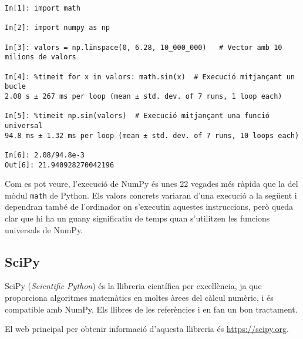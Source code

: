 \begin{lstlisting}
In[1]: import math

In[2]: import numpy as np

In[3]: valors = np.linspace(0, 6.28, 10_000_000)   # Vector amb 10 milions de valors

In[4]: %timeit for x in valors: math.sin(x)  # Execució mitjançant un bucle
2.08 s ± 267 ms per loop (mean ± std. dev. of 7 runs, 1 loop each)

In[5]: %timeit np.sin(valors)  # Execució mitjançant una funció universal
94.8 ms ± 1.32 ms per loop (mean ± std. dev. of 7 runs, 10 loops each)

In[6]: 2.08/94.8e-3
Out[6]: 21.940928270042196
\end{lstlisting}

Com es pot veure, l'execució de NumPy és unes 22 vegades més ràpida que la del mòdul \texttt{math} de Python. Els valors concrets variaran d'una execució a la següent i dependran també de l'ordinador on s'executin aquestes instruccions, però queda clar que hi ha un guany significatiu de temps quan s'utilitzen les funcions universals de NumPy.


\subsection{SciPy}

SciPy (\textit{Scientific Python}) és la llibreria científica per exceŀlència, ja que proporciona algoritmes  matemàtics en moltes àrees del càlcul numèric, i és compatible amb NumPy. Els llibres de les referències \cite{JOH} i \cite{HIL} en fan un bon tractament.

El  web principal per obtenir informació d'aquesta llibreria és \href{https://scipy.org/}{https://scipy.org}.


